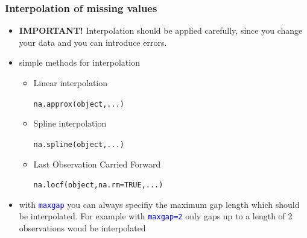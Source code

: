 \documentclass[xcolor=table, xcolor=dvipsnames]{beamer}\usepackage[]{graphicx}\usepackage[]{color}
\makeatletter
\newcommand{\hlnum}[1]{\textcolor[rgb]{0,0,0}{#1}}
\newcommand{\hlstd}[1]{\textcolor[rgb]{0,0,0}{#1}}
\newcommand{\hlkwc}[1]{\textcolor[rgb]{1,0,1}{#1}}
\newcommand{\hlkwd}[1]{\textcolor[rgb]{0,0,1}{#1}}
\newenvironment{kframe}{%
 \def\at@end@of@kframe{}%
 \ifinner\ifhmode%
  \def\at@end@of@kframe{\end{minipage}}%
  \begin{minipage}{\columnwidth}%
 \fi\fi%
 \def\FrameCommand##1{\hskip\@totalleftmargin \hskip-\fboxsep
 \colorbox{shadecolor}{##1}\hskip-\fboxsep
     \hskip-\linewidth \hskip-\@totalleftmargin \hskip\columnwidth}%
 \MakeFramed {\advance\hsize-\width
   \@totalleftmargin\z@ \linewidth\hsize
   \@setminipage}}%
 {\par\unskip\endMakeFramed%
 \at@end@of@kframe}
\newenvironment{knitrout}{}{} %
\newcommand{\rcode}[1]{\texttt{\textcolor{Blue}{#1}}} %
\makeatother
\begin{document}

\begin{frame}[fragile]\frametitle{Interpolation of missing values}
\begin{itemize}
\item{\textbf{IMPORTANT!} Interpolation should be applied carefully, since you change your data and you can introduce errors.}
\item{simple methods for interpolation}
    \begin{itemize}
    \item Linear interpolation
\begin{knitrout}
\color{fgcolor}\begin{kframe}
\begin{alltt}
\hlkwd{na.approx}\hlstd{(object, ...)}
\end{alltt}
\end{kframe}
\end{knitrout}
    \item Spline interpolation
\begin{knitrout}
\color{fgcolor}\begin{kframe}
\begin{alltt}
\hlkwd{na.spline}\hlstd{(object, ...)}
\end{alltt}
\end{kframe}
\end{knitrout}
    \item Last Observation Carried Forward
\begin{knitrout}
\color{fgcolor}\begin{kframe}
\begin{alltt}
\hlkwd{na.locf}\hlstd{(object,} \hlkwc{na.rm} \hlstd{=} \hlnum{TRUE}\hlstd{, ...)}
\end{alltt}
\end{kframe}
\end{knitrout}
    \end{itemize}
\item with \rcode{maxgap} you can always specifiy the maximum gap length which should be interpolated. For example with \rcode{maxgap=2} only gaps up to a length of 2 observations woud be interpolated
\end{itemize}
\end{frame}

\end{document}
